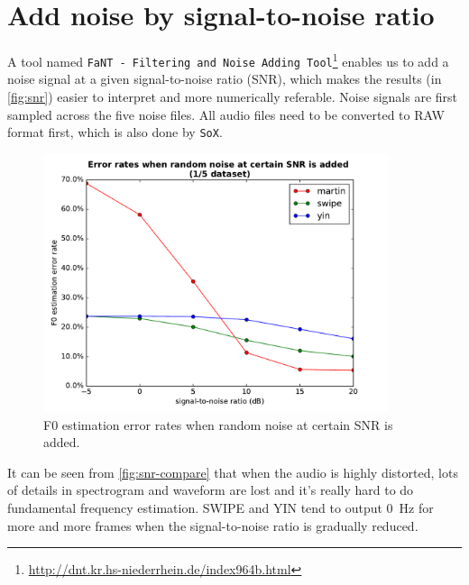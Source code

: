 \documentclass[11pt,a4paper]{report}
\begin{document}
\section{Add noise by signal-to-noise ratio}

A tool named \texttt{FaNT - Filtering and Noise Adding Tool}\footnote{\url{http://dnt.kr.hs-niederrhein.de/index964b.html}} enables us to add a noise signal at a given signal-to-noise ratio (SNR), which makes the results (in \autoref{fig:snr}) easier to interpret and more numerically referable.
Noise signals are first sampled across the five noise files.
All audio files need to be converted to RAW format first, which is also done by \texttt{SoX}.

\begin{figure}[htbp]
  \centering
  \includegraphics[width=0.9\textwidth]{error_rates_vs_snrs.pdf}
  \caption{F0 estimation error rates when random noise at certain SNR is added.} \label{fig:snr}
\end{figure}

It can be seen from \autoref{fig:snr-compare} that when the audio is highly distorted, lots of details in spectrogram and waveform are lost and it's really hard to do fundamental frequency estimation.
SWIPE and YIN tend to output \SI{0}{\hertz} for more and more frames when the signal-to-noise ratio is gradually reduced.
\end{document}
